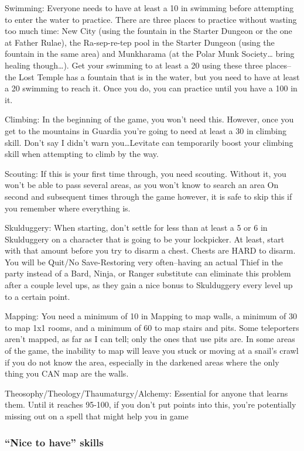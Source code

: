 \documentclass[12pt]{article}
\begin{document}
Swimming: Everyone needs to have at least a 10 in swimming before
attempting to enter the water to practice. There are three places to
practice without wasting too much time: New City (using the fountain in
the Starter Dungeon or the one at Father Rulae), the Ra-sep-re-tep pool
in the Starter Dungeon (using the fountain in the same area) and
Munkharama (at the Polar Munk Society\ldots{} bring healing
though\ldots{}). Get your swimming to at least a 20 using these three
places--the Lost Temple has a fountain that is in the water, but you
need to have at least a 20 swimming to reach it. Once you do, you can
practice until you have a 100 in it.

Climbing: In the beginning of the game, you won't need this. However,
once you get to the mountains in Guardia you're going to need at least a
30 in climbing skill. Don't say I didn't warn you\ldots{}Levitate can
temporarily boost your climbing skill when attempting to climb by the
way.

Scouting: If this is your first time through, you need scouting. Without
it, you won't be able to pass several areas, as you won't know to search
an area On second and subsequent times through the game however, it is
safe to skip this if you remember where everything is.

Skulduggery: When starting, don't settle for less than at least a 5 or 6
in Skulduggery on a character that is going to be your lockpicker. At
least, start with that amount before you try to disarm a chest. Chests
are HARD to disarm. You will be Quit/No Save-Restoring very
often--having an actual Thief in the party instead of a Bard, Ninja, or
Ranger substitute can eliminate this problem after a couple level ups,
as they gain a nice bonus to Skulduggery every level up to a certain
point.

Mapping: You need a minimum of 10 in Mapping to map walls, a minimum of
30 to map 1x1 rooms, and a minimum of 60 to map stairs and pits. Some
teleporters aren't mapped, as far as I can tell; only the ones that use
pits are. In some areas of the game, the inability to map will leave you
stuck or moving at a snail's crawl if you do not know the area,
especially in the darkened areas where the only thing you CAN map are
the walls.

Theosophy/Theology/Thaumaturgy/Alchemy: Essential for anyone that learns
them. Until it reaches 95-100, if you don't put points into this, you're
potentially missing out on a spell that might help you in game

\subsubsection{\texorpdfstring{``Nice to have''
skills}{Nice to have skills}}\label{nice-to-have-skills}
\end{document}
